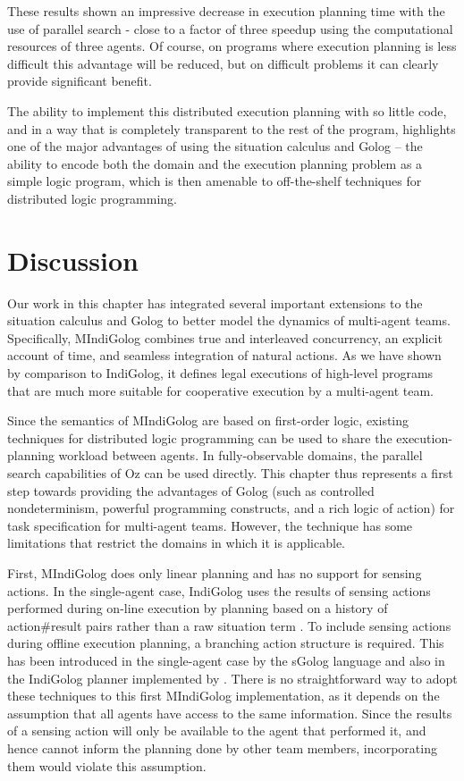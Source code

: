 These results shown an impressive decrease in execution planning time
with the use of parallel search - close to a factor of three speedup
using the computational resources of three agents. Of course, on programs
where execution planning is less difficult this advantage will be
reduced, but on difficult problems it can clearly provide significant
benefit.

The ability to implement this distributed execution planning with
so little code, and in a way that is completely transparent to the
rest of the program, highlights one of the major advantages of using
the situation calculus and Golog -- the ability to encode both the
domain and the execution planning problem as a simple logic program,
which is then amenable to off-the-shelf techniques for distributed
logic programming.


\section{Discussion\label{sec:MIndiGolog:Discussion}}

Our work in this chapter has integrated several important extensions
to the situation calculus and Golog to better model the dynamics of
multi-agent teams. Specifically, MIndiGolog combines true and interleaved
concurrency, an explicit account of time, and seamless integration
of natural actions. As we have shown by comparison to IndiGolog, it
defines legal executions of high-level programs that are much more
suitable for cooperative execution by a multi-agent team.

Since the semantics of MIndiGolog are based on first-order logic,
existing techniques for distributed logic programming can be used
to share the execution-planning workload between agents. In fully-observable
domains, the parallel search capabilities of Oz can be used directly.
This chapter thus represents a first step towards providing the advantages
of Golog (such as controlled nondeterminism, powerful programming
constructs, and a rich logic of action) for task specification for
multi-agent teams. However, the technique has some limitations that
restrict the domains in which it is applicable.

First, MIndiGolog does only linear planning and has no support for
sensing actions. In the single-agent case, IndiGolog uses the results
of sensing actions performed during on-line execution by planning
based on a history of action\#result pairs rather than a raw situation
term \citep{giacomo99indigolog}. To include sensing actions during
offline execution planning, a branching action structure is required.
This has been introduced in the single-agent case by the sGolog language
\citep{lakemeyer99golog_cats} and also in the IndiGolog planner implemented
by \citep{giacomo04sem_delib_indigolog}. There is no straightforward
way to adopt these techniques to this first MIndiGolog implementation,
as it depends on the assumption that all agents have access to the
same information. Since the results of a sensing action will only
be available to the agent that performed it, and hence cannot inform
the planning done by other team members, incorporating them would
violate this assumption.

